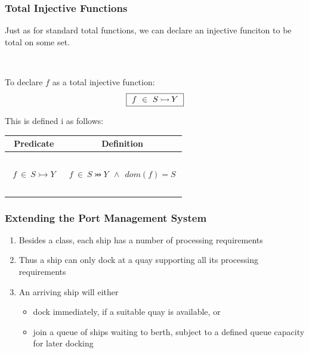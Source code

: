 \documentclass{beamer}
\begin{document}
\begin{frame}

\frametitle{Total Injective Functions}

Just as for standard total functions, we can declare an injective funciton to be
 \alert{total on some set}.



~

To declare $f$ as a total injective function:
\[
     \mbox{\fbox{$~f ~\in~ S \mathbin\rightarrowtail Y~$}}
\]

This is defined i as follows:

\begin{center}
\begin{tabular}{|c|c|}
\hline
Predicate & Definition \\[2pt] \hline
~&\\
$~~f ~\in~ S \tinj Y~~$ &  $~f ~\in~ S \pinj Y ~~\land~~dom(f) =S ~$  \\
~&\\ \hline\end{tabular}
\end{center}


\end{frame}





\begin{frame}

\frametitle{Extending the Port Management System}

\begin{enumerate}


\item Besides a class, each ship has a number of \alert{processing requirements}\\[2ex]

\item Thus a ship can only dock at a quay supporting \alert{all} its processing requirements\\[2ex]


\item  An arriving ship will either
\begin{itemize}
\item dock immediately, if a suitable quay is available, or
\item join a queue of ships waiting to berth, subject to a defined queue capacity for later docking
\end{itemize}


\end{enumerate}



\end{frame}
\end{document}
